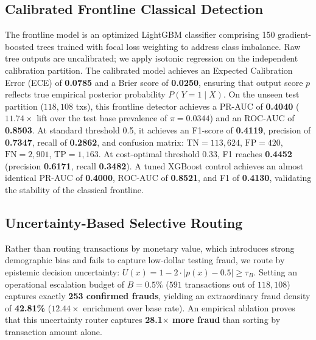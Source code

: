 \documentclass[10pt,a4paper]{article}
\begin{document}
\subsection{Calibrated Frontline Classical Detection}
The frontline model is an optimized LightGBM classifier comprising 150 gradient-boosted trees trained with focal loss weighting to address class imbalance. Raw tree outputs are uncalibrated; we apply isotonic regression on the independent calibration partition. The calibrated model achieves an Expected Calibration Error (ECE) of \textbf{0.0785} and a Brier score of \textbf{0.0250}, ensuring that output score $p$ reflects true empirical posterior probability $P(Y=1 \mid X)$. On the unseen test partition ($118,108$ txs), this frontline detector achieves a PR-AUC of \textbf{0.4040} ($11.74\times$ lift over the test base prevalence of $\pi = 0.0344$) and an ROC-AUC of \textbf{0.8503}. At standard threshold 0.5, it achieves an F1-score of \textbf{0.4119}, precision of \textbf{0.7347}, recall of \textbf{0.2862}, and confusion matrix: $\text{TN}=113,624$, $\text{FP}=420$, $\text{FN}=2,901$, $\text{TP}=1,163$. At cost-optimal threshold 0.33, F1 reaches \textbf{0.4452} (precision \textbf{0.6171}, recall \textbf{0.3482}). A tuned XGBoost control achieves an almost identical PR-AUC of \textbf{0.4000}, ROC-AUC of \textbf{0.8521}, and F1 of \textbf{0.4130}, validating the stability of the classical frontline.

\clearpage


\subsection{Uncertainty-Based Selective Routing}
Rather than routing transactions by monetary value, which introduces strong demographic bias and fails to capture low-dollar testing fraud, we route by epistemic decision uncertainty: $U(x) = 1 - 2 \cdot |p(x) - 0.5| \ge \tau_B$. Setting an operational escalation budget of $B = 0.5\%$ ($591$ transactions out of $118,108$) captures exactly \textbf{253 confirmed frauds}, yielding an extraordinary fraud density of \textbf{42.81\%} ($12.44\times$ enrichment over base rate). An empirical ablation proves that this uncertainty router captures \textbf{28.1$\times$ more fraud} than sorting by transaction amount alone.
\end{document}
